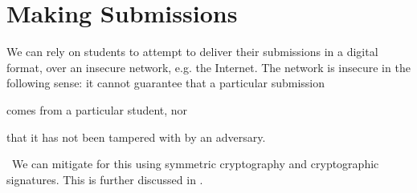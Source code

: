 
\section{Making Submissions}

We can rely on students to attempt to deliver their submissions in a digital
format, over an insecure network, e.g. the Internet. The network is insecure in
the following sense: it cannot guarantee that a particular submission
\begin{inparaenum}[(a)] \item comes from a particular student, nor \item that
it has not been tampered with by an adversary.\end{inparaenum}~We can mitigate
for this using symmetric cryptography and cryptographic signatures. This is
further discussed in .

